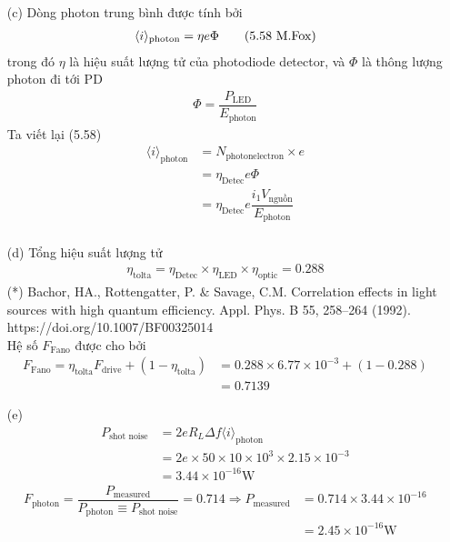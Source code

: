 \documentclass{article}
\newcommand{\f}[2]{\dfrac{#1}{#2}}
\begin{document}
\begin{enumerate}
	\item[(c)] Dòng photon trung bình được tính bởi
	\begin{align*}
		\langle i \rangle_{\text{photon}} = \eta e \Phi \tag{5.58 \text{M.Fox}}
	\end{align*}
	trong đó $\eta$ là hiệu suất lượng tử của photodiode detector, và $\Phi$ là thông lượng photon đi tới PD\\
	\begin{align*}
		\Phi = \f{P_{\text{LED}}}{E_{\text{photon}}}
	\end{align*}
	Ta viết lại (5.58)
	\begin{align*}
		\langle i \rangle_{\text{photon}}
		&= N_{\text{photonelectron}} \times e  \\
		&= \eta_{\text{Detec}} e \Phi \\
		&= \eta_{\text{Detec}} e \f{i_{1} V_{\text{nguồn}}}{E_{\text{photon}}} \\
	\end{align*}
	\item[(d)] Tổng hiệu suất lượng tử
	\begin{align*}
		\eta_{\text{tolta}} = \eta_{\text{Detec}} \times \eta_{\text{LED}} \times \eta_{\text{optic}} = 0.288  \tag{*}
	\end{align*}
	(*) Bachor, HA., Rottengatter, P. $\&$ Savage, C.M. Correlation effects in light sources with high quantum efficiency. Appl. Phys. B 55, 258–264 (1992).\\ https://doi.org/10.1007/BF00325014 \\
	Hệ số $F_{\text{Fano}}$ được cho bởi
	\begin{align*}
		F_{\text{Fano}} = \eta_{\text{tolta}} F_{\text{drive}} + (1 - \eta_{\text{tolta}}) 
		&= 0.288 \times 6.77 \times 10^{-3} + (1 - 0.288)\\
		&= 0.7139
	\end{align*}
	\item[(e)]
	\begin{align*}
		P_{\text{shot noise}} 
		&= 2 e R_{L} \Delta f \langle i \rangle_{\text{photon}} \\
		&= 2e \times 50 \times 10 \times 10^{3} \times 2.15 \times 10^{-3} \\
		&= 3.44 \times 10^{-16} \text{W} \tag{1}
	\end{align*}
	\begin{align*}
		F_{\text{photon}} = \f{P_\text{measured}}{P_{\text{photon}} \equiv P_{\text{shot noise}} } = 0.714 \Rightarrow P_\text{measured} 
		&= 0.714 \times 3.44 \times 10^{-16}\\
		&= 2.45 \times 10^{-16} \text{W}
	\end{align*}
\end{enumerate}
\end{document}

